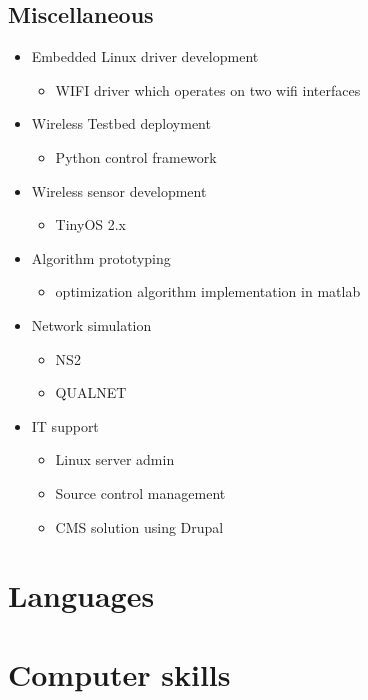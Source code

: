 \documentclass[11pt,a4paper,sans]{moderncv}        %
\begin{document}
\subsection{Miscellaneous}
\begin{itemize}%
\item Embedded Linux driver development
  \begin{itemize}%
  \item WIFI driver which operates on two wifi interfaces
  \end{itemize}
\item Wireless Testbed deployment
  \begin{itemize}%
  \item Python control framework
  \end{itemize}
\item Wireless sensor development
  \begin{itemize}%
  \item TinyOS 2.x
  \end{itemize}
\item Algorithm prototyping
  \begin{itemize}%
  \item optimization algorithm implementation in matlab
  \end{itemize}
\item Network simulation
  \begin{itemize}%
  \item NS2
  \item QUALNET
  \end{itemize}
\item IT support
  \begin{itemize}%
  \item Linux server admin
  \item Source control management
  \item CMS solution using Drupal
  \end{itemize}
\end{itemize}

\section{Languages}

\section{Computer skills}
\end{document}
